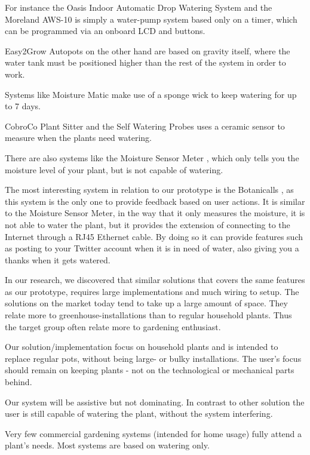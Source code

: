 \documentclass{ubicomp2012}
\begin{document}
For instance the Oasis Indoor Automatic Drop Watering System \cite{oasis-auto-drip} and the Moreland AWS-10 \cite{moreland} is simply a water-pump system based only on a timer, which can be programmed via an onboard LCD and buttons.

Easy2Grow Autopots \cite{autopots} on the other hand are based on gravity itself, where the water tank must be positioned higher than the rest of the system in order to work.

Systems like Moisture Matic \cite{moisture-matic} make use of a sponge wick to keep watering for up to 7 days.

CobroCo Plant Sitter \cite{plant-sitter} and the Self Watering Probes \cite{self-watering-probes} uses a ceramic sensor to measure when the plants need watering.

There are also systems like the Moisture Sensor Meter \cite{moisture-meter}, which only tells you the moisture level of your plant, but is not capable of watering.

The most interesting system in relation to our prototype is the Botanicalls \cite{botanicalls}, as this system is the only one to provide feedback based on user actions. It is similar to the Moisture Sensor Meter, in the way that it only measures the moisture, it is not able to water the plant, but it provides the extension of connecting to the Internet through a RJ45 Ethernet cable. By doing so it can provide features such as posting to your Twitter account when it is in need of water, also giving you a thanks when it gets watered.


In our research, we discovered that similar solutions that covers the same features as our prototype, requires large implementations and much wiring to setup. The solutions on the market today tend to take up a large amount of space. They relate more to greenhouse-installations than to regular household plants. Thus the target group often relate more to gardening enthusiast.

Our solution/implementation focus on household plants and is intended to replace regular pots, without being large- or bulky installations. The user's focus should remain on keeping plants - not on the technological or mechanical parts behind.

Our system will be assistive but not dominating. In contrast to other solution the user is still capable of watering the plant, without the system interfering.

Very few commercial gardening systems (intended for home usage) fully attend a plant’s needs. Most systems are based on watering only.
\end{document}
